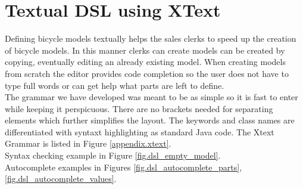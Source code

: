 \section{Textual DSL using XText}
\label{sec.xtext}

\noindent
Defining bicycle models textually helps the sales clerks to 
speed up the creation of bicycle models. In this manner clerks 
can create models can be created by copying, eventually editing 
an already existing model. When creating models from scratch 
the editor provides code completion so the user does not have to 
type full words or can get help what parts are left to define.\\
The grammar we have developed was meant to be as simple
so it is fast to enter while keeping it perspicuous. There are no
brackets needed for separating elements which further simplifies 
the layout. The keywords and class names are differentiated with 
syntaxt highlighting as standard Java code. 
The Xtext Grammar is listed in Figure \ref{appendix.xtext}.\\
Syntax checking example in Figure \ref{fig.dsl_empty_model}.\\
Autocomplete examples in Figures \ref{fig.dsl_autocomplete_parts},
\ref{fig.dsl_autocomplete_values}.\\

